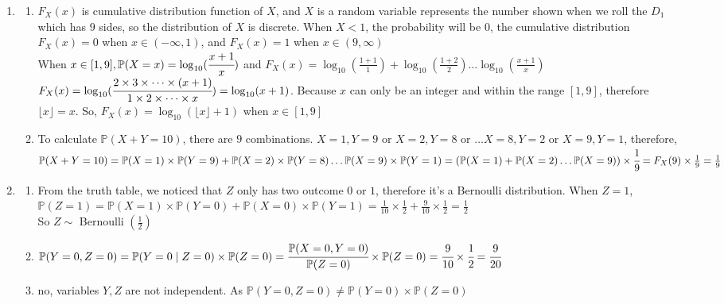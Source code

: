 \documentclass[12pt, oneside, a4paper]{article}
\begin{document}
	\begin{enumerate}
		\item \begin{enumerate}[label = (\alph*)]
			\item $F_X(x)$ is cumulative distribution function of $X$, and $X$ is a random variable represents the number shown when we roll the $D_1$ which has $9$ sides, so the distribution of $X$ is discrete. When $X < 1$, the probability will be $0$, the cumulative distribution $F_X(x) =0$ when $x \in (-\infty, 1)$, and $F_X(x) = 1$ when $x \in (9, \infty)$ \\
			When $x \in [1,9], \mathbb{P} (X = x) = \log_{10}(\cfrac{x+1}{x})$ and $F_X(x) = \log_{10}(\frac{1+1}{1}) + \log_{10}(\frac{1+2}{2}) \dots \log_{10}(\frac{x+1}{x})$ \\
			$F_X(x) = \log_{10}(\cfrac{2 \times 3 \times \dots \times (x+1)}{1 \times 2 \times \dots \times x}) = \log_{10}(x + 1)$. Because $x$ can only be an integer and within the range $[1,9]$, therefore $\lfloor x \rfloor = x$. So, $F_X(x) = \log_{10}(\lfloor x \rfloor  + 1)$ when $x \in [1,9]$
			\item To calculate $\mathbb{P}(X + Y = 10)$, there are $9$ combinations. 
			$X = 1, Y = 9$ or $X = 2, Y = 8$ or $\dots X = 8, Y = 2$ or $X = 9, Y = 1$,  therefore, \\
			$\mathbb{P}(X+Y = 10) = \mathbb{P}(X=1)\times \mathbb{P}(Y=9) + \mathbb{P}(X=2)\times \mathbb{P}(Y=8) \dots  \mathbb{P}(X=9)\times \mathbb{P}(Y=1) = \left(\mathbb{P}(X = 1) +\mathbb{P}(X = 2) \dots \mathbb{P}(X=9)\right) \times \cfrac{1}{9} = F_X(9) \times \frac{1}{9} = \frac{1}{9}$
		\end{enumerate}
		\item \begin{enumerate}[label = (\alph*)]
			\item From the truth table, we noticed that $Z$ only has two outcome $0$ or $1$, therefore it's a Bernoulli distribution. 
			When $Z=1$, $\mathbb{P}(Z=1) = \mathbb{P}(X =1) \times \mathbb{P}(Y=0) + \mathbb{P}(X =0) \times \mathbb{P}(Y=1) = \frac{1}{10} \times 
		\frac{1}{2} + \frac{9}{10}\times \frac{1}{2} = \frac{1}{2}$\\
		So $Z \sim $ Bernoulli $(\frac{1}{2})$
			\item $\mathbb{P}(Y = 0, Z = 0) = \mathbb{P}(Y = 0 \mid Z = 0) \times \mathbb{P}(Z = 0) \\
			= \cfrac{\mathbb{P}(X=0, Y=0)}{\mathbb{P}(Z=0)} \times \mathbb{P}(Z=0)
			= \cfrac{9}{10} \times \cfrac{1}{2} = \cfrac{9}{20}$
			\item no, variables $Y, Z$ are not independent. As $\mathbb{P}(Y = 0, Z = 0) \neq \mathbb{P}(Y = 0) \times \mathbb{P}(Z=0)$
 		\end{enumerate}
	\end{enumerate}
\end{document}
